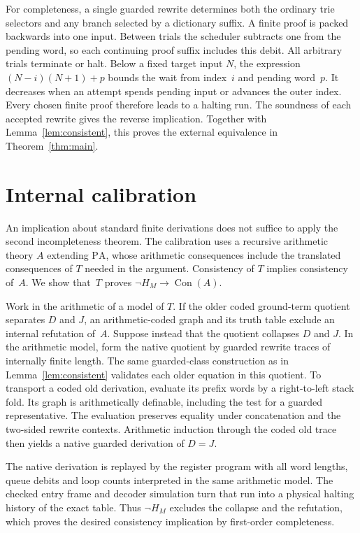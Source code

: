 \documentclass[11pt,letterpaper]{article}
\newcommand{\Con}{\operatorname{Con}}
\begin{document}
For completeness, a single guarded rewrite determines both the
ordinary trie selectors and any branch selected by a dictionary
suffix. A finite proof is packed backwards into one input. Between
trials the scheduler subtracts one from the pending word, so each
continuing proof suffix includes this debit. All arbitrary trials
terminate or halt. Below a fixed target input $N$, the expression
$(N-i)(N+1)+p$ bounds the wait from index~$i$ and pending word~$p$.
It decreases when an attempt spends pending input or advances the
outer index. Every chosen finite proof therefore leads to a halting
run. The soundness of each accepted rewrite gives the reverse
implication. Together with Lemma~\ref{lem:consistent}, this proves the
external equivalence in Theorem~\ref{thm:main}.

\section{Internal calibration}

An implication about standard finite derivations does not suffice
to apply the second incompleteness theorem. The calibration uses a
recursive arithmetic theory $A$ extending $\mathrm{PA}$, whose
arithmetic consequences include the translated consequences of $T$
needed in the argument. Consistency of $T$ implies consistency of~$A$.
We show that~$T$ proves $\neg H_M\to\Con(A)$.

Work in the arithmetic of a model of $T$. If the older coded
ground-term quotient separates $D$ and $J$, an arithmetic-coded graph
and its truth table exclude an internal refutation of~$A$. Suppose
instead that the quotient collapses $D$ and $J$. In the arithmetic
model, form the native quotient by guarded rewrite traces of
internally finite length. The same guarded-class construction as in
Lemma~\ref{lem:consistent} validates each older equation in this
quotient. To transport a coded old derivation, evaluate its prefix
words by a right-to-left stack fold. Its graph is arithmetically
definable, including the test for a guarded representative. The
evaluation preserves equality under concatenation and the two-sided
rewrite contexts. Arithmetic induction through the coded old trace
then yields a native guarded derivation of $D=J$.

The native derivation is replayed by the register program with all
word lengths, queue debits and loop counts interpreted in the same
arithmetic model. The checked entry frame and decoder simulation turn
that run into a physical halting history of the exact table. Thus
$\neg H_M$ excludes the collapse and the refutation, which proves
the desired consistency implication by first-order completeness.
\end{document}
